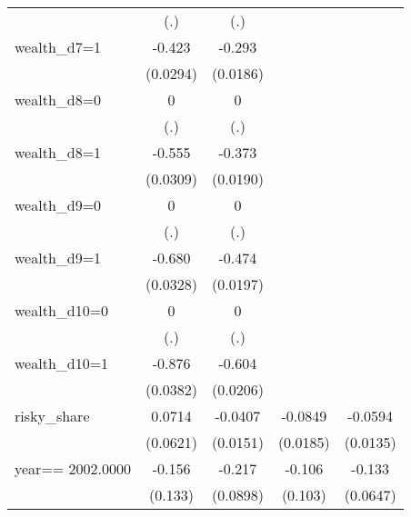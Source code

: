\begin{table}[htbp]
\begin{tabular}{l*{4}{c}}
                &      (.)         &      (.)         &                  &                  \\
\addlinespace
wealth\_d7=1     &   -0.423\sym{***}&   -0.293\sym{***}&                  &                  \\
                & (0.0294)         & (0.0186)         &                  &                  \\
\addlinespace
wealth\_d8=0     &        0         &        0         &                  &                  \\
                &      (.)         &      (.)         &                  &                  \\
\addlinespace
wealth\_d8=1     &   -0.555\sym{***}&   -0.373\sym{***}&                  &                  \\
                & (0.0309)         & (0.0190)         &                  &                  \\
\addlinespace
wealth\_d9=0     &        0         &        0         &                  &                  \\
                &      (.)         &      (.)         &                  &                  \\
\addlinespace
wealth\_d9=1     &   -0.680\sym{***}&   -0.474\sym{***}&                  &                  \\
                & (0.0328)         & (0.0197)         &                  &                  \\
\addlinespace
wealth\_d10=0    &        0         &        0         &                  &                  \\
                &      (.)         &      (.)         &                  &                  \\
\addlinespace
wealth\_d10=1    &   -0.876\sym{***}&   -0.604\sym{***}&                  &                  \\
                & (0.0382)         & (0.0206)         &                  &                  \\
\addlinespace
risky\_share     &   0.0714         &  -0.0407\sym{***}&  -0.0849\sym{***}&  -0.0594\sym{***}\\
                & (0.0621)         & (0.0151)         & (0.0185)         & (0.0135)         \\
\addlinespace
year==  2002.0000&   -0.156         &   -0.217\sym{**} &   -0.106         &   -0.133\sym{**} \\
                &  (0.133)         & (0.0898)         &  (0.103)         & (0.0647)         \\

\end{tabular}
\end{table}
